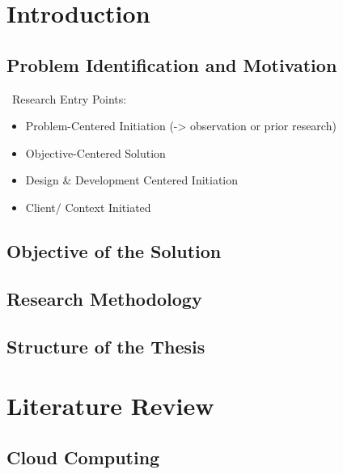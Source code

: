 \chapter{Introduction}

	\section{Problem Identification and Motivation}
	
	~\newline Research Entry Points:
	
	\begin{itemize}
		\item Problem-Centered Initiation (-> observation or prior research)
		\item Objective-Centered Solution
		\item Design \& Development Centered Initiation
		\item Client/ Context Initiated
	\end{itemize}
	
	\section{Objective of the Solution}

	\section{Research Methodology}
	
	\section{Structure of the Thesis}

\chapter{Literature Review}

	\section{Cloud Computing}

